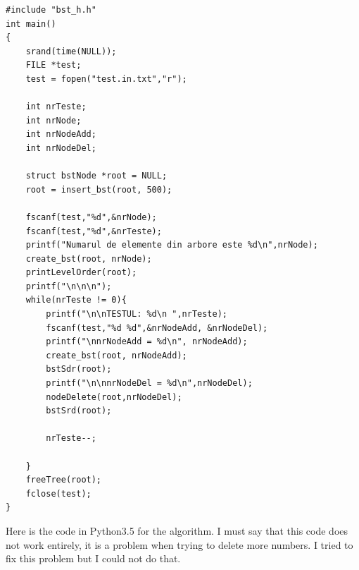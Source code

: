 \documentclass{article}
\begin{document}
\begin{lstlisting}
#include "bst_h.h"
int main()
{
    srand(time(NULL));
    FILE *test;     
    test = fopen("test.in.txt","r");
    
    int nrTeste;
    int nrNode;
    int nrNodeAdd;
    int nrNodeDel;

    struct bstNode *root = NULL;
    root = insert_bst(root, 500);

    fscanf(test,"%d",&nrNode);
    fscanf(test,"%d",&nrTeste);
    printf("Numarul de elemente din arbore este %d\n",nrNode);
    create_bst(root, nrNode);
    printLevelOrder(root);
    printf("\n\n\n");
    while(nrTeste != 0){
        printf("\n\nTESTUL: %d\n ",nrTeste);
        fscanf(test,"%d %d",&nrNodeAdd, &nrNodeDel);
        printf("\nnrNodeAdd = %d\n", nrNodeAdd);
        create_bst(root, nrNodeAdd);
        bstSdr(root);
        printf("\n\nnrNodeDel = %d\n",nrNodeDel);
        nodeDelete(root,nrNodeDel);
        bstSrd(root);

        nrTeste--;

    }
    freeTree(root);
    fclose(test);
}

\end{lstlisting}

Here is the code in Python3.5 for the algorithm. I must say that this code does not work entirely, it is a problem when trying to delete more numbers. I tried to fix this problem but I could not do that.
\end{document}
